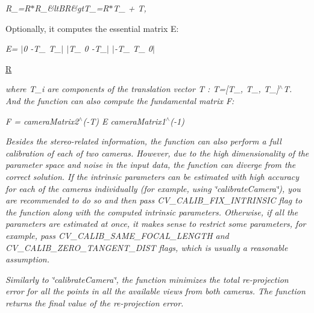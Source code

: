 {\itshape R\+\_=R$\ast$\+R\+\_\&lt\+BR\&gt\+T\+\_=R$\ast$\+T\+\_ + T,}

Optionally, it computes the essential matrix E\+:

{\itshape E= $\vert$0 -\/\+T\+\_ T\+\_$\vert$ $\vert$\+T\+\_ 0 -\/\+T\+\_$\vert$ $\vert$-\/\+T\+\_ T\+\_ 0$\vert$}

{\itshape  
\begin{DoxyItemize}
\item \mbox{\hyperlink{classorg_1_1opencv_1_1_r}{R}} 
\end{DoxyItemize}}

{\itshape }

{\itshape where {\itshape T\+\_\+i} are components of the translation vector {\itshape T} \+: {\itshape T=\mbox{[}T\+\_, T\+\_, T\+\_\mbox{]}$^\wedge$T}. And the function can also compute the fundamental matrix F\+:}

{\itshape }

{\itshape }

{\itshape {\itshape F = camera\+Matrix2$^\wedge$(-\/T) E camera\+Matrix1$^\wedge$(-\/1)}}

{\itshape }

{\itshape }

{\itshape Besides the stereo-\/related information, the function can also perform a full calibration of each of two cameras. However, due to the high dimensionality of the parameter space and noise in the input data, the function can diverge from the correct solution. If the intrinsic parameters can be estimated with high accuracy for each of the cameras individually (for example, using \char`\"{}calibrate\+Camera\char`\"{}), you are recommended to do so and then pass {\ttfamily C\+V\+\_\+\+C\+A\+L\+I\+B\+\_\+\+F\+I\+X\+\_\+\+I\+N\+T\+R\+I\+N\+S\+IC} flag to the function along with the computed intrinsic parameters. Otherwise, if all the parameters are estimated at once, it makes sense to restrict some parameters, for example, pass {\ttfamily C\+V\+\_\+\+C\+A\+L\+I\+B\+\_\+\+S\+A\+M\+E\+\_\+\+F\+O\+C\+A\+L\+\_\+\+L\+E\+N\+G\+TH} and {\ttfamily C\+V\+\_\+\+C\+A\+L\+I\+B\+\_\+\+Z\+E\+R\+O\+\_\+\+T\+A\+N\+G\+E\+N\+T\+\_\+\+D\+I\+ST} flags, which is usually a reasonable assumption.}

{\itshape }

{\itshape }

{\itshape Similarly to \char`\"{}calibrate\+Camera\char`\"{}, the function minimizes the total re-\/projection error for all the points in all the available views from both cameras. The function returns the final value of the re-\/projection error.}

